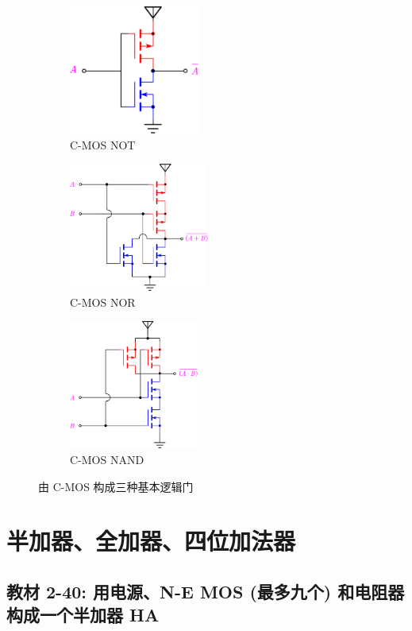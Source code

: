\documentclass[UTF8]{report}
\theoremstyle{MyLineTheoremStyle} %
\theoremstyle{MyBlockTheoremStyle} %
\theoremstyle{MySubsubsectionStyle} %
\begin{document}
\begin{figure}[H]\centering
    \begin{subfigure}[t]{0.33\columnwidth}\centering
        \includegraphics[height=120pt]{assets/5/CMOS NOT.pdf}
        \caption{ C-MOS NOT }
    \end{subfigure}\hfill
    \begin{subfigure}[t]{0.33\columnwidth}\centering
        \includegraphics[height=120pt]{assets/5/CMOS NOR.pdf}
        \caption{ C-MOS NOR }
    \end{subfigure}
    \begin{subfigure}[t]{0.33\columnwidth}\centering
        \includegraphics[height=120pt]{assets/5/CMOS NAND.pdf}
        \caption{ C-MOS NAND }
    \end{subfigure}
    \caption{ 由 C-MOS 构成三种基本逻辑门 }\label{由 C-MOS 构成三种基本逻辑门}
\end{figure}


\section{半加器、全加器、四位加法器}

\subsection{教材 2-40: 用电源、N-E MOS (最多九个) 和电阻器构成一个半加器 HA}
\end{document}
